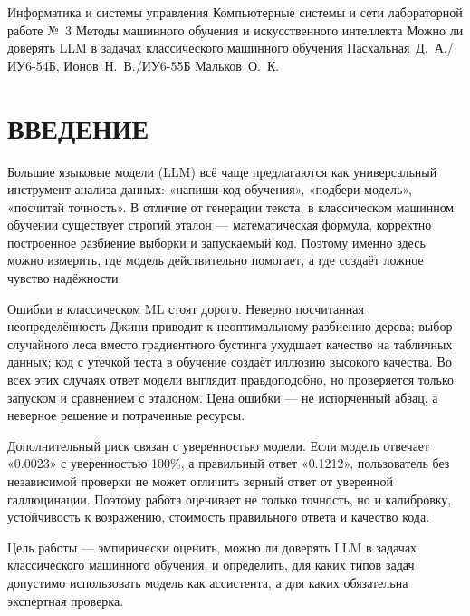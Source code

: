 \documentclass{bmstu}
\begin{document}
    \makereporttitle
    {Информатика и системы управления}
    {Компьютерные системы и сети}
    {лабораторной работе №~3}
    {Методы машинного обучения и искусственного интеллекта}
    {Можно ли доверять LLM в задачах классического
    машинного обучения}
    {}
    {Пасхальная~Д.~А./ИУ6-54Б, Ионов~Н.~В./ИУ6-55Б}
    {Мальков~О.~К.}

    \maketableofcontents

\chapter*{ВВЕДЕНИЕ}

Большие языковые модели (LLM) всё чаще предлагаются как универсальный инструмент анализа данных: «напиши код обучения», «подбери модель», «посчитай точность». В отличие от генерации текста, в классическом машинном обучении существует строгий эталон — математическая формула, корректно построенное разбиение выборки и запускаемый код. Поэтому именно здесь можно измерить, где модель действительно помогает, а где создаёт ложное чувство надёжности.

Ошибки в классическом ML стоят дорого. Неверно посчитанная неопределённость Джини приводит к неоптимальному разбиению дерева; выбор случайного леса вместо градиентного бустинга ухудшает качество на табличных данных; код с утечкой теста в обучение создаёт иллюзию высокого качества. Во всех этих случаях ответ модели выглядит правдоподобно, но проверяется только запуском и сравнением с эталоном. Цена ошибки — не испорченный абзац, а неверное решение и потраченные ресурсы.

Дополнительный риск связан с уверенностью модели. Если модель отвечает «0.0023» с уверенностью 100\%, а правильный ответ «0.1212», пользователь без независимой проверки не может отличить верный ответ от уверенной галлюцинации. Поэтому работа оценивает не только точность, но и калибровку, устойчивость к возражению, стоимость правильного ответа и качество кода.

Цель работы — эмпирически оценить, можно ли доверять LLM в задачах классического машинного обучения, и определить, для каких типов задач допустимо использовать модель как ассистента, а для каких обязательна экспертная проверка.
\end{document}
